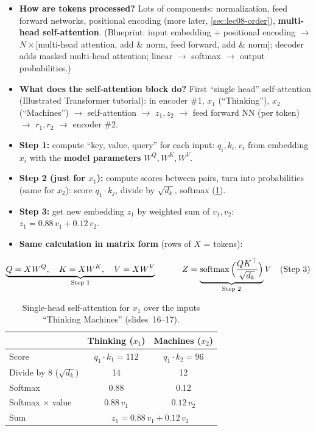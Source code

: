 \begin{itemize}
  \item \textbf{How are tokens processed?} Lots of components: normalization,
    feed forward networks, positional encoding (more later,
    \cref{sec:lec08-order}), \textbf{multi-head self-attention}. (Blueprint:
    input embedding + positional encoding $\to$ $N\times$[multi-head attention,
    add \& norm, feed forward, add \& norm]; decoder adds masked multi-head
    attention; linear $\to$ softmax $\to$ output probabilities.)
  \item \textbf{What does the self-attention block do?} First ``single head''
    self-attention (Illustrated Transformer tutorial): in encoder \#1, $x_1$
    (``Thinking''), $x_2$ (``Machines'') $\to$ self-attention $\to$ $z_1,z_2$
    $\to$ feed forward NN (per token) $\to$ $r_1,r_2$ $\to$ encoder \#2.
  \item \textbf{Step 1:} compute ``key, value, query'' for each input:
    $q_i,k_i,v_i$ from embedding $x_i$ with the \textbf{model parameters}
    $W^Q,W^K,W^V$.
  \item \textbf{Step 2 (just for $x_1$):} compute scores between pairs, turn
    into probabilities (same for $x_2$): score $q_1\cdot k_j$, divide by
    $\sqrt{d_k}$, softmax (\cref{tab:lec08-attn}).
  \item \textbf{Step 3:} get new embedding $z_1$ by weighted sum of $v_1,v_2$:
    $z_1 = 0.88\,v_1+0.12\,v_2$.
  \item \textbf{Same calculation in matrix form} (rows of $X$ = tokens):
\end{itemize}
\begin{equation}\label{eq:lec08-attn}
  \underbrace{Q = XW^Q,\quad K = XW^K,\quad V = XW^V}_{\text{Step 1}}
  \qquad\quad
  Z = \underbrace{\operatorname{softmax}\Big(\frac{QK^{\top}}{\sqrt{d_k}}\Big)}_{\text{Step 2}}V
  \quad(\text{Step 3})
\end{equation}

\begin{table}[htbp]
  \centering\small
  \caption{Single-head self-attention for $x_1$ over the inputs ``Thinking
  Machines'' (slides~16--17).}
  \label{tab:lec08-attn}
  \begin{tabular}{@{}lcc@{}}
    \toprule
    & Thinking ($x_1$) & Machines ($x_2$)\\
    \midrule
    Score & $q_1\cdot k_1 = 112$ & $q_1\cdot k_2 = 96$\\
    Divide by 8 ($\sqrt{d_k}$) & 14 & 12\\
    Softmax & 0.88 & 0.12\\
    Softmax $\times$ value & $0.88\,v_1$ & $0.12\,v_2$\\
    \midrule
    Sum & \multicolumn{2}{c}{$z_1 = 0.88\,v_1 + 0.12\,v_2$}\\
    \bottomrule
  \end{tabular}
\end{table}

